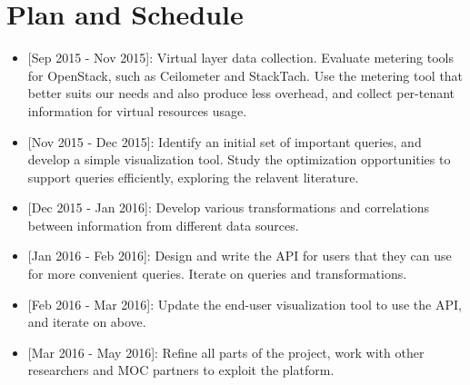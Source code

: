 \section{Plan and Schedule}
\label{sec:Plan}

%

\begin{itemize}
\item{[Sep 2015 - Nov 2015]:} Virtual layer data collection. Evaluate metering tools for OpenStack, such as Ceilometer and StackTach. Use the metering tool that better suits our needs and also produce less overhead, and collect per-tenant information for virtual resources usage. 
\item{[Nov 2015 - Dec 2015]:} Identify an initial set of important queries, and develop a simple visualization tool. Study the optimization opportunities to support queries efficiently, exploring the relavent literature. 
\item{[Dec 2015 - Jan 2016]:} Develop various transformations and correlations between information from different data sources. 
\item{[Jan 2016 - Feb 2016]:} Design and write the API for users that they can use for more convenient queries. Iterate on queries and transformations. 
\item{[Feb 2016 - Mar 2016]:} Update the end-user visualization tool to use the API, and iterate on above. 
\item{[Mar 2016 - May 2016]:} Refine all parts of the project, work with other researchers and MOC partners to exploit the platform. 
\end{itemize}
